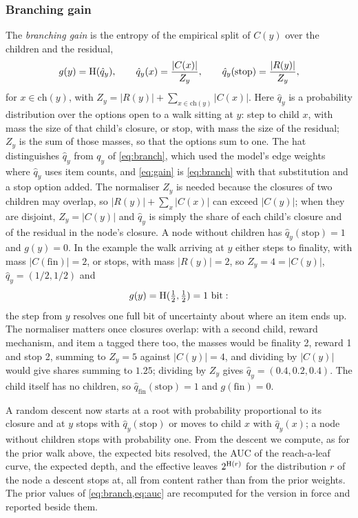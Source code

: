 \subsubsection{Branching gain}
The \emph{branching gain} is the entropy of the empirical split of $C(y)$
over the children and the residual,
\begin{equation}
  \label{eq:gain}
  g(y) = \operatorname{H}(\hat q_y), \qquad
  \hat q_y(x) = \frac{|C(x)|}{Z_y},\qquad
  \hat q_y(\mathrm{stop}) = \frac{|R(y)|}{Z_y},
\end{equation}
for $x \in \mathrm{ch}(y)$, with $Z_y = |R(y)| + \sum_{x \in \mathrm{ch}(y)}
|C(x)|$. Here $\hat q_y$ is a probability distribution over the options
open to a walk sitting at $y$: step to child $x$, with mass the size of
that child's closure, or stop, with mass the size of the residual; $Z_y$
is the sum of those masses, so that the options sum to one. The hat
distinguishes $\hat q_y$ from $q_y$ of \cref{eq:branch}, which used the
model's edge weights where $\hat q_y$ uses item counts, and \cref{eq:gain}
is \cref{eq:branch} with that substitution and a stop option added. The
normaliser $Z_y$ is needed because the closures of two children may
overlap, so $|R(y)| + \sum_x |C(x)|$ can exceed $|C(y)|$; when they are
disjoint, $Z_y = |C(y)|$ and $\hat q_y$ is simply the share of each child's
closure and of the residual in the node's closure. A node without children
has $\hat q_y(\mathrm{stop}) = 1$ and $g(y) = 0$. In the example the walk
arriving at $y$ either steps to finality, with mass $|C(\mathrm{fin})| =
2$, or stops, with mass $|R(y)| = 2$, so $Z_y = 4 = |C(y)|$,
$\hat q_y = (1/2, 1/2)$ and
\begin{equation*}
  g(y) = \operatorname{H}(\tfrac{1}{2}, \tfrac{1}{2}) = 1 \text{ bit}:
\end{equation*}
the step from $y$ resolves one full bit of uncertainty about where an item
ends up. The normaliser matters once closures overlap: with a second child,
reward mechanism, and item a tagged there too, the masses would be finality
2, reward 1 and stop 2, summing to $Z_y = 5$ against $|C(y)| = 4$, and
dividing by $|C(y)|$ would give shares summing to $1.25$; dividing by $Z_y$
gives $\hat q_y = (0.4, 0.2, 0.4)$. The child itself has no children, so
$\hat q_{\mathrm{fin}}(\mathrm{stop}) = 1$ and $g(\mathrm{fin}) = 0$.

A random descent now starts at a root with probability proportional to its
closure and at $y$ stops with $\hat q_y(\mathrm{stop})$ or moves to child
$x$ with $\hat q_y(x)$; a node without children stops with probability one.
From the descent we compute, as for the prior walk above, the expected
bits resolved, the AUC of the reach-a-leaf curve, the expected depth, and
the effective leaves $2^{\operatorname{H}(r)}$ for the distribution $r$ of the node
a descent stops at, all from content rather than from the prior weights. The
prior values of \cref{eq:branch,eq:auc} are recomputed for the version in
force and reported beside them.

